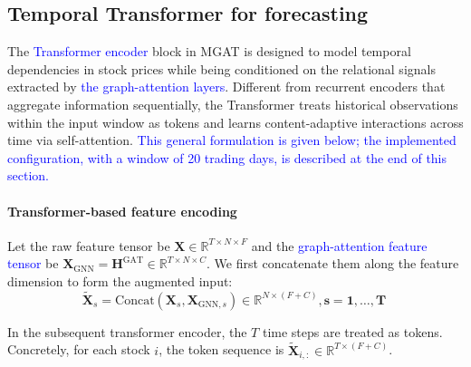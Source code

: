 \documentclass[pdflatex,sn-mathphys-num]{sn-jnl}%
\theoremstyle{thmstyleone}%
\theoremstyle{thmstyletwo}%
\theoremstyle{thmstylethree}%
\begin{document}
\subsection{Temporal Transformer for forecasting}\label{subsec4}

The \textcolor{blue}{Transformer encoder \citep{Vaswani2017Attention}} block in MGAT is designed to model temporal dependencies in stock prices while being conditioned on the relational signals extracted by \textcolor{blue}{the graph-attention layers}. 
Different from recurrent encoders that aggregate information sequentially, the Transformer treats historical observations within the input window as tokens and learns content-adaptive interactions across time via self-attention. 
\textcolor{blue}{This general formulation is given below; the implemented configuration, with a window of 20 trading days, is described at the end of this section.}

\paragraph{Transformer-based feature encoding}
Let the raw feature tensor be $\mathbf{X}\in\mathbb{R}^{T\times N\times F}$ and the \textcolor{blue}{graph-attention feature tensor} be $\mathbf{X}_{\mathrm{GNN}}=\mathbf{H}^{\mathrm{GAT}}\in\mathbb{R}^{T\times N\times C}$. 
We first concatenate them along the feature dimension to form the augmented input:
\begin{equation}
\tilde{\mathbf{X}}_{s}
=
\mathrm{Concat}\!\left(\mathbf{X}_{s},\mathbf{X}_{\mathrm{GNN},s}\right)
\in\mathbb{R}^{N\times(F+C)},
\mathbf s
=
\mathbf 1,\ldots,\mathbf T\
\label{eq:concat_re}
\end{equation}

In the subsequent transformer encoder, the $T$ time steps are treated as tokens. Concretely, for each stock $i$, the token sequence is $\tilde{\mathbf{X}}_{i,:}\in\mathbb{R}^{T\times(F+C)}$.
\end{document}
